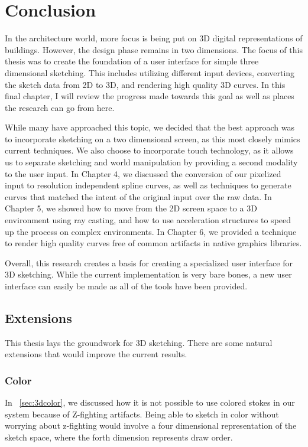 \chapter{Conclusion}

In the architecture world, more focus is being put on 3D digital representations of buildings.
However, the design phase remains in two dimensions.
The focus of this thesis was to create the foundation of a user interface for simple three dimensional sketching.
This includes utilizing different input devices, converting the sketch data from 2D to 3D, and rendering high quality 3D curves.
In this final chapter, I will review the progress made towards this goal as well as places the research can go from here.

While many have approached this topic, we decided that the best approach was to incorporate sketching on a two dimensional screen, as this most closely mimics current techniques.
We also choose to incorporate touch technology, as it allows us to separate sketching and world manipulation by providing a second modality to the user input.
In Chapter 4, we discussed the conversion of our pixelized input to resolution independent spline curves, as well as techniques to generate curves that matched the intent of the original input over the raw data.
In Chapter 5, we showed how to move from the 2D screen space to a 3D environment using ray casting, and how to use acceleration structures to speed up the process on complex environments.
In Chapter 6, we provided a technique to render high quality curves free of common artifacts in native graphics libraries.

Overall, this research creates a basis for creating a specialized user interface for 3D sketching.
While the current implementation is very bare bones, a new user interface can easily be made as all of the tools have been provided.

\section{Extensions}

This thesis lays the groundwork for 3D sketching. There are some natural extensions that would improve the current results.

\subsection{Color}

In ~\ref{sec:3dcolor}, we discussed how it is not possible to use colored stokes in our system because of Z-fighting artifacts.
Being able to sketch in color without worrying about z-fighting would involve a four dimensional representation of the sketch space, where the forth dimension represents draw order.

